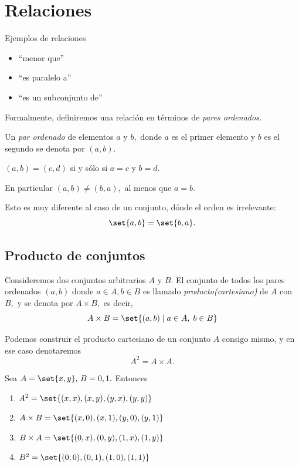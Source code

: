 \section{Relaciones}


	{Ejemplos de relaciones}
	\begin{itemize}
		\item ``menor que''
		\item ``es paralelo a''
		\item ``es un subconjunto de''
	\end{itemize}




	Formalmente, definiremos una relación en t\'erminos de \emph{pares ordenados.}



	\begin{definicion}
		Un \emph{par ordenado} de elementos $a$ y $b,$ donde $a$ es el primer elemento y $b$ es el segundo se denota por $(a,b).$
	\end{definicion}





	\begin{axioma}
		$(a,b)=(c,d)$  si y sólo si $a=c$ y
		$b=d.$
	\end{axioma}



	En particular $(a,b)\neq(b,a),$  al menos que $a=b.$



	Esto es muy diferente al caso de un conjunto, dónde el orden es irrelevante:
	$$
	\set{a,b}=\set{b,a}.
	$$


\subsection{Producto de conjuntos}


	Consideremos dos conjuntos arbitrarios $A$ y $B.$ 	El conjunto de todos los pares ordenados $(a,b)$ donde $a\in A, b \in B$ es llamado \emph{producto(cartesiano)} de $A$ con $B,$ y se denota por $A \times B,$ es decir,
	$$
	A \times B = \set{(a,b) \mid a \in A, \; b \in B}
	$$



	Podemos construir el producto cartesiano de un conjunto $A$ consigo mismo, y en ese caso denotaremos
	$$A^{2}= A\times A.$$



	\begin{problema}
		Sea $A=\set{x,y}, \, B={0,1}.$ Entonces
		\begin{enumerate}
			\item $A^{2}=\set{(x,x), (x,y), (y,x), (y,y)}$
			\item $A\times B= \set{(x,0), (x,1), (y,0), (y,1)}$
			\item $B\times A= \set{(0,x), (0,y), (1, x), (1,y)}$
			\item $B^2=\set{(0,0), (0,1), (1,0), (1,1)}$
		\end{enumerate}

	\end{problema}




